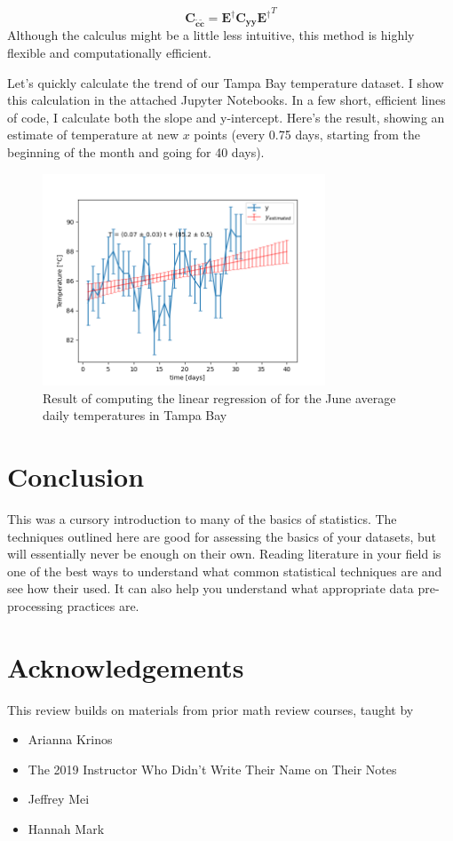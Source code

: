 \documentclass{article}
\begin{document}
\begin{equation}
\label{eq:31}
\mathbf{C_{\tilde{c}\tilde{c}} = \mathbf{E^{\dagger}} C_{yy} \mathbf{E^{\dagger}}}^{T}
\end{equation}
Although the calculus might be a little less intuitive, this method is highly flexible and computationally efficient. 

Let's quickly calculate the trend of our Tampa Bay temperature dataset. I show this calculation in the attached Jupyter Notebooks. In a few short, efficient lines of code, I calculate both the slope and y-intercept. Here's the result, showing an estimate of temperature at new $x$ points (every 0.75 days, starting from the beginning of the month and going for 40 days). 

\begin{figure}[htbp]
\centerline{\includegraphics[width = 0.75\textwidth]{regression.png}}
\caption[]{\label{fig:regression} Result of computing the linear regression of for the June average daily temperatures in Tampa Bay}
\end{figure}

\section{Conclusion}
This was a cursory introduction to many of the basics of statistics. The techniques outlined here are good for assessing the basics of your datasets, but will essentially never be enough on their own. Reading literature in your field is one of the best ways to understand what common statistical techniques are and see how their used. It can also help you understand what appropriate data pre-processing practices are.

\clearpage
\section{Acknowledgements}
This review builds on materials from prior math review courses, taught by
\begin{itemize}
\item Arianna Krinos
\item The 2019 Instructor Who Didn't Write Their Name on Their Notes
\item Jeffrey Mei
\item Hannah Mark
\end{itemize}
\end{document}
